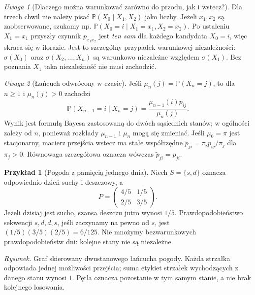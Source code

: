\documentclass[11pt,a4paper,oneside]{report}
\numberwithin{equation}{chapter}
\theoremstyle{plain}
\theoremstyle{definition}
\newtheorem{przyklad}{Przykład}[chapter]
\theoremstyle{remark}
\newtheorem{uwaga}{Uwaga}[chapter]
\newcommand{\Prob}{\mathbb{P}}
\begin{document}
\begin{uwaga}[Dlaczego można warunkować zarówno do przodu, jak i wstecz?]
Dla trzech chwil nie należy pisać
$\Prob(X_0\mid X_1,X_2)$ jako liczby.
Jeżeli $x_1,x_2$ są zaobserwowane, szukamy np.
$\Prob(X_0=i\mid X_1=x_1,X_2=x_2)$.
Po ustaleniu $X_1=x_1$ przyszły czynnik
$p_{x_1x_2}$ jest \emph{ten sam} dla każdego
kandydata $X_0=i$, więc skraca się w ilorazie.
Jest to szczególny przypadek warunkowej niezależności:
$\sigma(X_0)$ oraz $\sigma(X_2,\ldots,X_n)$
są warunkowo niezależne względem $\sigma(X_1)$.
Bez poznania $X_1$ taka niezależność nie musi zachodzić.
\end{uwaga}

\begin{uwaga}[Łańcuch odwrócony w czasie]
Jeśli $\mu_n(j)=\Prob(X_n=j)$, to dla $n\geq1$
i $\mu_n(j)>0$ zachodzi
\[
\Prob(X_{n-1}=i\mid X_n=j)
=\frac{\mu_{n-1}(i)p_{ij}}{\mu_n(j)}.
\]
Wynik jest formułą Bayesa zastosowaną do dwóch
sąsiednich stanów; w ogólności zależy od $n$,
ponieważ rozkłady $\mu_{n-1}$ i $\mu_n$ mogą się zmieniać.
Jeśli $\mu_0=\pi$ jest stacjonarny, macierz
przejścia wstecz ma stałe współrzędne
$\widetilde p_{ji}=\pi_i p_{ij}/\pi_j$
dla $\pi_j>0$. Równowaga szczegółowa oznacza
wówczas $\widetilde p_{ji}=p_{ji}$.
\end{uwaga}

\begin{przyklad}[Pogoda z pamięcią jednego dnia]
Niech $S=\{s,d\}$ oznacza odpowiednio dzień suchy
i deszczowy, a
\[
P=\begin{pmatrix} 4/5&1/5\\ 2/5&3/5\end{pmatrix}.
\]
Jeżeli dzisiaj jest sucho, szansa deszczu jutro
wynosi $1/5$. Prawdopodobieństwo sekwencji
$s,d,d,s$, jeśli zaczynamy na pewno od $s$, jest
$(1/5)(3/5)(2/5)=6/125$. Nie mnożymy
bezwarunkowych prawdopodobieństw dni: kolejne stany
nie są niezależne.
\end{przyklad}


\begin{center}

{\small\emph{Rysunek.} Graf skierowany dwustanowego łańcucha pogody.
Każda strzałka odpowiada jednej możliwości przejścia;
suma etykiet strzałek wychodzących z danego stanu wynosi $1$.
Pętla oznacza pozostanie w tym samym stanie, a nie brak kolejnego losowania.}
\end{center}
\end{document}
